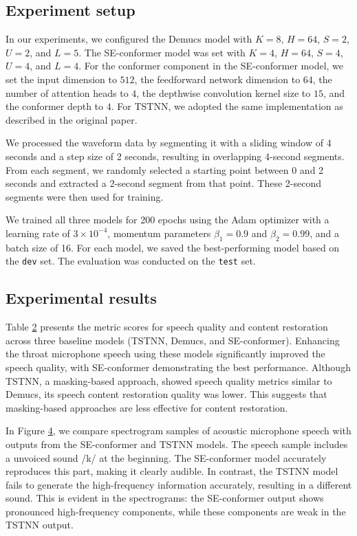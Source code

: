 \documentclass[10pt]{wlscirep}
\begin{document}
\subsection*{Experiment setup}
In our experiments, we configured the Demucs model with $K=8$, $H=64$, $S=2$, $U=2$, and  $L=5$. The SE-conformer model was set with $K=4$, $H=64$, $S=4$, $U=4$, and $L=4$. For the conformer component in the SE-conformer model, we set the input dimension to $512$, the feedforward network dimension to $64$, the number of attention heads to $4$, the depthwise convolution kernel size to $15$, and the conformer depth to $4$. For TSTNN, we adopted the same implementation as described in the original paper\cite{wang2021tstnn}.

We processed the waveform data by segmenting it with a sliding window of 4 seconds and a step size of 2 seconds, resulting in overlapping 4-second segments. From each segment, we randomly selected a starting point between 0 and 2 seconds and extracted a 2-second segment from that point. These 2-second segments were then used for training.

We trained all three models for 200 epochs using the Adam optimizer with a learning rate of $3 \times 10^{-4}$, momentum parameters $\beta_1 = 0.9$ and $\beta_2 = 0.99$, and a batch size of 16. For each model, we saved the best-performing model based on the \texttt{dev} set. The evaluation was conducted on the \texttt{test} set.

\subsection*{Experimental results}
Table \hyperref[table:2]{2} presents the metric scores for speech quality and content restoration across three baseline models (TSTNN, Demucs, and SE-conformer). Enhancing the throat microphone speech using these models significantly improved the speech quality, with SE-conformer demonstrating the best performance. Although TSTNN, a masking-based approach, showed speech quality metrics similar to Demucs, its speech content restoration quality was lower. This suggests that masking-based approaches are less effective for content restoration.

In Figure \hyperref[fig:4]{4}, we compare spectrogram samples of acoustic microphone speech with outputs from the SE-conformer and TSTNN models. The speech sample includes a unvoiced sound /k/ at the beginning. The SE-conformer model accurately reproduces this part, making it clearly audible. In contrast, the TSTNN model fails to generate the high-frequency information accurately, resulting in a different sound. This is evident in the spectrograms: the SE-conformer output shows pronounced high-frequency components, while these components are weak in the TSTNN output.
\end{document}

